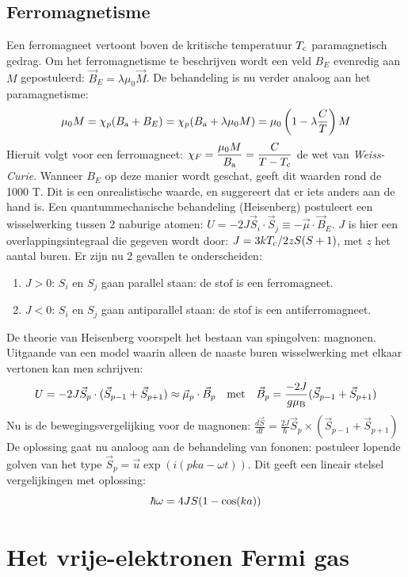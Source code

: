 \documentclass[twoside]{report}
\begin{document}
\subsection{Ferromagnetisme}
Een ferromagneet vertoont boven de kritische temperatuur $T_{\rm c}$
paramagnetisch gedrag. Om het ferromagnetisme te beschrijven wordt een veld
$B_E$ evenredig aan $M$ gepostuleerd: $\vec{B}_E=\lambda\mu_0\vec{M}$.
De behandeling is nu verder analoog aan het paramagnetisme:
\[
\mu_0 M=\chi_p(B_{\rm a}+B_E)=\chi_p(B_{\rm a}+\lambda\mu_0 M)=
\mu_0\left(1-\lambda\frac{C}{T}\right)M
\]
Hieruit volgt voor een ferromagneet:
$\displaystyle\chi_F=\frac{\mu_0 M}{B_{\rm a}}=\frac{C}{T-T_{\rm c}}$
de wet van {\it Weiss-Curie}.
\npar
Wanneer $B_E$ op deze manier wordt geschat, geeft dit waarden rond de 1000 T.
Dit is een onrealistische waarde, en suggereert dat er iets anders aan de
hand is. Een quantummechanische behandeling (Heisenberg) postuleert een
wisselwerking tussen 2 naburige atomen:
$U=-2J\vec{S}_i\cdot\vec{S}_j\equiv-\vec{\mu}\cdot\vec{B}_E$. $J$ is hier een
overlappingsintegraal die gegeven wordt door: $J=3kT_{\rm c}/2zS(S+1)$,
met $z$ het aantal buren. Er zijn nu 2 gevallen te onderscheiden:
\begin{enumerate}
\item $J>0$: $S_i$ en $S_j$ gaan parallel staan: de stof is een ferromagneet.
\item $J<0$: $S_i$ en $S_j$ gaan antiparallel staan: de stof is een
      antiferromagneet.
\end{enumerate}
De theorie van Heisenberg voorspelt het bestaan van spingolven: magnonen.
Uitgaande van een model waarin alleen de naaste buren wisselwerking met
elkaar vertonen kan men schrijven:
\[
U=-2J\vec{S}_p\cdot(\vec{S}_{p-1}+\vec{S}_{p+1})\approx
\vec{\mu}_p\cdot\vec{B}_p~~~\mbox{met}~~~
\vec{B}_p=\frac{-2J}{g\mu_{\rm B}}(\vec{S}_{p-1}+\vec{S}_{p+1})
\]
Nu is de bewegingsvergelijking voor de magnonen:
$\displaystyle\frac{d\vec{S}}{dt}=\frac{2J}{\hbar}\vec{S}_p\times(\vec{S}_{p-1}+\vec{S}_{p+1})$
\npar
De oplossing gaat nu analoog aan de behandeling van fononen: postuleer
lopende golven van het type $\vec{S}_p=\vec{u}\exp(i(pka-\omega t))$.
Dit geeft een lineair stelsel vergelijkingen met oplossing:
\[
\hbar\omega=4JS(1-\cos(ka))
\]

\section{Het vrije-elektronen Fermi gas}
\end{document}
